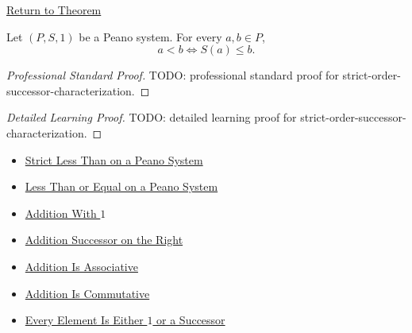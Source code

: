 \newpage
{}
\label{prf:strict-order-successor-characterization}

\begin{remark*}[Return]
\hyperref[thm:strict-order-successor-characterization]{Return to Theorem}
\end{remark*}

\begin{theorem*}
Let $(P,S,1)$ be a Peano system. For every $a,b \in P$,
\[
a<b
\Longleftrightarrow
S(a) \le b.
\]
\end{theorem*}

\begin{proof}[Professional Standard Proof]
\LRAProofBodyStart
TODO: professional standard proof for strict-order-successor-characterization.
\end{proof}

\begin{proof}[Detailed Learning Proof]
\LRAProofBodyStart
TODO: detailed learning proof for strict-order-successor-characterization.
\end{proof}

\begin{remark*}
\end{remark*}

\begin{dependencies}
\begin{itemize}
  \item \hyperref[def:strict-less-than-on-peano-system]{Strict Less Than on a Peano System}
  \item \hyperref[def:less-than-or-equal-on-peano-system]{Less Than or Equal on a Peano System}
  \item \hyperref[thm:addition-with-one]{Addition With $1$}
  \item \hyperref[thm:addition-successor-on-right]{Addition Successor on the Right}
  \item \hyperref[thm:addition-associative]{Addition Is Associative}
  \item \hyperref[thm:addition-commutative]{Addition Is Commutative}
  \item \hyperref[thm:every-element-is-one-or-a-successor]{Every Element Is Either $1$ or a Successor}
\end{itemize}
\end{dependencies}

\clearpage
